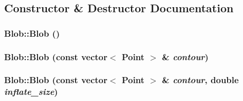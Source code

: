 \subsection{Constructor \& Destructor Documentation}
\hypertarget{class_blob_a6a0d29e3183e1458d1b9e6a5ca584826}{
\subsubsection[{Blob}]{\setlength{\rightskip}{0pt plus 5cm}Blob::Blob ()}}
\label{class_blob_a6a0d29e3183e1458d1b9e6a5ca584826}
\hypertarget{class_blob_a3b184a0014375ffe79cabc2acf385b36}{
\subsubsection[{Blob}]{\setlength{\rightskip}{0pt plus 5cm}Blob::Blob (const vector$<$ Point $>$ \& {\em contour})}}
\label{class_blob_a3b184a0014375ffe79cabc2acf385b36}
\hypertarget{class_blob_a9149d5db7849d239af4b3c6924edc1c5}{
\subsubsection[{Blob}]{\setlength{\rightskip}{0pt plus 5cm}Blob::Blob (const vector$<$ Point $>$ \& {\em contour}, \/  double {\em inflate\_\-size})}}
\label{class_blob_a9149d5db7849d239af4b3c6924edc1c5}



